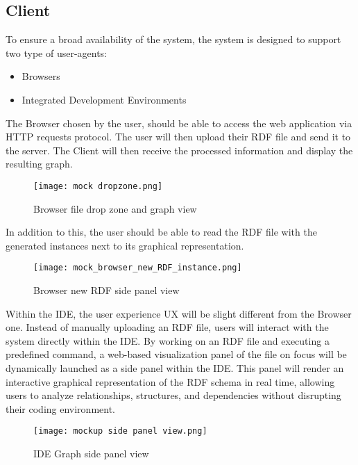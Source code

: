 \subsection{Client\label{sec:reqsuba}}
To ensure a broad availability of the system, the system is designed to support two type of user-agents:
\begin{itemize}
    \item Browsers
    \item Integrated Development Environments 
\end{itemize}
The Browser chosen by the user, should be able to access the web application via HTTP requests protocol.
The user will then upload their RDF file and send it to the server.
The Client will then receive the processed information and display the resulting graph.

\begin{figure}[H]
    \centering
    \texttt{[image: mock dropzone.png]}\\
    \caption{Browser file drop zone and graph view }\label{fig:BrowserGraphView}
  \end{figure}

In addition to this, the user should be able to read the RDF file with the generated instances next to its graphical representation.

\begin{figure}[H]
    \centering
    \texttt{[image: mock\_browser\_new\_RDF\_instance.png]}\\
    \caption{Browser new RDF side panel view }\label{fig:BrowserRDFReader}
  \end{figure}

Within the IDE, the user experience UX will be slight different from the Browser one. Instead of manually uploading an RDF file, users will interact with the system directly within the IDE. By working on an RDF file and executing a predefined command, a web-based visualization panel of the file on focus will be dynamically launched as a side panel within the IDE. This panel will render an interactive graphical representation of the RDF schema in real time, allowing users to analyze relationships, structures, and dependencies without disrupting their coding environment. 

\begin{figure}[H]
    \centering
    \texttt{[image: mockup side panel view.png]}\\
    \caption{IDE Graph side panel view}\label{fig:IDEGraphView}
  \end{figure}

